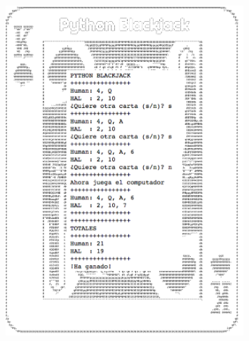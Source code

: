 \documentclass[11pt,letterpaper]{exam}
\begin{document}
\begin{figure}[h!]
\begin{center}
	\includegraphics[width=0.8\textwidth]{./pyblackj.pdf}
\end{center}
\end{figure}
%
%
%
\end{document}
